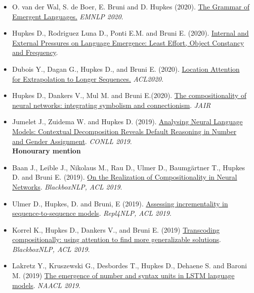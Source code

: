 \begin{itemize}
\setlength\itemsep{5pt}
\item O. van der Wal, S. de Boer, E. Bruni and D. Hupkes (2020). \href{https://www.aclweb.org/anthology/2020.emnlp-main.270.pdf}{The Grammar of Emergent Languages.} \textit{EMNLP 2020}.

    \item Hupkes D., Rodriguez Luna D., Ponti E.M. and Bruni E. (2020). \href{https://arxiv.org/pdf/2004.03868.pdf}{Internal and External Pressures on Language Emergence: Least Effort, Object Constancy and Frequency}.

    \item Dubois Y., Dagan G., Hupkes D., and Bruni E. (2020). \href{https://www.aclweb.org/anthology/2020.acl-main.39.pdf}{Location Attention for Extrapolation to Longer Sequences.} \textit{ACL2020}.
        
    \item Hupkes D., Dankers V., Mul M. and Bruni E.(2020). \href{https://www.jair.org/index.php/jair/article/view/11674/26576}{The compositionality of neural networks: integrating symbolism and connectionism}. \textit{JAIR}
    
    \item Jumelet J., Zuidema W. and Hupkes D. (2019). \href{https://arxiv.org/pdf/1909.08975.pdf}{Analysing Neural Language Models: Contextual Decomposition Reveals Default Reasoning in Number and Gender Assignment}. \textit{CONLL 2019}.\\ \textbf{Honourary mention}
    
    \item Baan J., Leible J., Nikolaus M., Rau D., Ulmer D., Baumgärtner T., Hupkes D. and Bruni E. (2019). \href{https://www.aclweb.org/anthology/W19-4814}{On the Realization of Compositionality in Neural Networks}. \textit{BlackboxNLP, ACL 2019}. 
    
    \item Ulmer D., Hupkes, D. and Bruni, E (2019). \href{https://www.aclweb.org/anthology/W19-4324}{Assessing incrementality in sequence-to-sequence models}. \textit{Repl4NLP, ACL 2019}. 
    
    \item Korrel K., Hupkes D., Dankers V., and Bruni E. (2019) \href{https://www.aclweb.org/anthology/W19-4801}{Transcoding compositionally: using attention to find more generalizable solutions}. \textit{BlackboxNLP, ACL 2019}.
    
    \item Lakretz Y., Kruszewski G., Desbordes T., Hupkes D., Dehaene S. and Baroni M. (2019) \href{https://www.aclweb.org/anthology/N19-1002}{The emergence of number and syntax units in LSTM language models}. \textit{NAACL 2019}.


\end{itemize}

